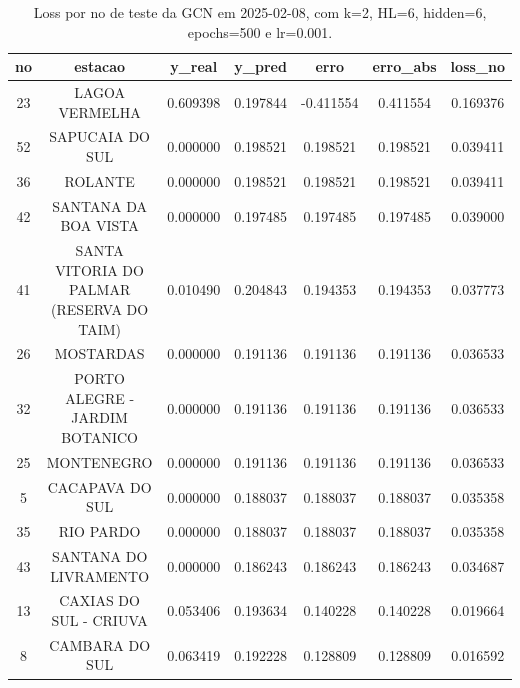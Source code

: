 \begin{table}[h]
\centering
\caption{Loss por no de teste da GCN em 2025-02-08, com k=2, HL=6, hidden=6, epochs=500 e lr=0.001.}
\label{tab:gcn_loss_k2_hl6_h6_e500_d20250208}
\begin{tabular}{ccccccc}
\toprule
no & estacao & y\_real & y\_pred & erro & erro\_abs & loss\_no \\
\midrule
23 & LAGOA VERMELHA & 0.609398 & 0.197844 & -0.411554 & 0.411554 & 0.169376 \\
52 & SAPUCAIA DO SUL & 0.000000 & 0.198521 & 0.198521 & 0.198521 & 0.039411 \\
36 & ROLANTE & 0.000000 & 0.198521 & 0.198521 & 0.198521 & 0.039411 \\
42 & SANTANA DA BOA VISTA & 0.000000 & 0.197485 & 0.197485 & 0.197485 & 0.039000 \\
41 & SANTA VITORIA DO PALMAR (RESERVA DO TAIM) & 0.010490 & 0.204843 & 0.194353 & 0.194353 & 0.037773 \\
26 & MOSTARDAS & 0.000000 & 0.191136 & 0.191136 & 0.191136 & 0.036533 \\
32 & PORTO ALEGRE - JARDIM BOTANICO & 0.000000 & 0.191136 & 0.191136 & 0.191136 & 0.036533 \\
25 & MONTENEGRO & 0.000000 & 0.191136 & 0.191136 & 0.191136 & 0.036533 \\
5 & CACAPAVA DO SUL & 0.000000 & 0.188037 & 0.188037 & 0.188037 & 0.035358 \\
35 & RIO PARDO & 0.000000 & 0.188037 & 0.188037 & 0.188037 & 0.035358 \\
43 & SANTANA DO LIVRAMENTO & 0.000000 & 0.186243 & 0.186243 & 0.186243 & 0.034687 \\
13 & CAXIAS DO SUL - CRIUVA & 0.053406 & 0.193634 & 0.140228 & 0.140228 & 0.019664 \\
8 & CAMBARA DO SUL & 0.063419 & 0.192228 & 0.128809 & 0.128809 & 0.016592 \\
\bottomrule
\end{tabular}
\end{table}

